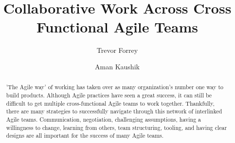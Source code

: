 \documentclass[sigplan,screen]{acmart}
\begin{document}
%
\title{Collaborative Work Across Cross Functional Agile Teams}
  
%
\author{Trevor Forrey}
\author{Aman Kaushik}
\authornotemark[1]

%
\begin{abstract}
'The Agile way' of working has taken over as many organization's number one way to build products.
Although Agile practices have seen a great success, it can still be difficult to get multiple cross-functional Agile teams to work together.
Thankfully, there are many strategies to successfully navigate through this network of interlinked Agile teams.
Communication, negotiation, challenging assumptions, having a willingness to change, learning from others, team structuring, tooling, and having clear designs are all important for the success of many Agile teams.
\end{abstract}


%

\maketitle
\end{document}
